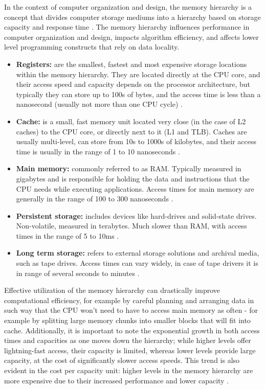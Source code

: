 \noindent In the context of computer organization and design, the memory hierarchy is a concept that divides computer storage mediums into a hierarchy based on storage capacity and response time
\cite{oldbooksmarthead}. The memory hierarchy influences performance in computer organization and design,
impacts algorithm efficiency, and affects lower level programming constructs that rely on data locality.

\begin{itemize}
	\item \textbf{Registers:} are the smallest, fastest and most expensive storage locations within the memory hierarchy. They are located directly at the CPU core, and their access speed and capacity depends on the processor
		architecture, but typically they can store up to 100s of bytes, and the access time is less than a nanosecond (usually not more than one CPU cycle) \cite{whatevery}.
	\item \textbf{Cache:} is a small, fast memory unit located very close (in the case of L2 caches) to the CPU core, or directly next to it (L1 and TLB). Caches are usually multi-level,
		can store from 10s to 1000s of kilobytes, and their access time is usually in the range of 1 to 10 nanoseconds \cite{whatevery, Patterson2013}.
	\item \textbf{Main memory:} commonly referred to as RAM. Typically measured in gigabytes and is responsible for holding the data and instructions that the CPU needs while executing
		applications. Access times for main memory are generally in the range of 100 to 300 nanoseconds \cite{whatevery, Hamacher2011}.
	\item \textbf{Persistent storage:} includes devices like hard-drives and solid-state drives. Non-volatile, measured in terabytes. Much slower than RAM, with access times in the range of 5 to 10ms \cite{hddssdspeeds}.
	\item \textbf{Long term storage:} refers to external storage solutions and archival media, such as tape drives. Access times can vary widely, in case of tape drivers it is in range of several
		seconds to minutes \cite{tapetimesspeed}.
\end{itemize}

\noindent Effective utilization of the memory hierarchy can drastically improve computational efficiency, for example by careful planning and arranging data in such way that the
CPU won't need to have to access main memory as often - for example by splitting large memory chunks into smaller blocks that will fit into cache.
Additionally, it is important to note the exponential growth in both access times and capacities as one moves down the hierarchy; while higher levels offer lightning-fast access,
their capacity is limited, whereas lower levels provide large capacity, at the cost of significantly slower access speeds. This trend is also evident in the cost per capacity unit:
higher levels in the memory hierarchy are more expensive due to their increased performance and lower capacity \cite{comparchaquant}.

